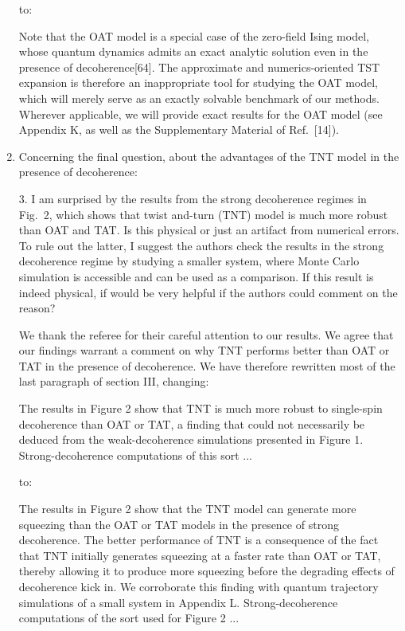 \documentclass[preprint,superscriptaddress]{revtex4-2}
\newcommand{\1}{\mathds{1}}
\newcommand{\blue}[1]{{\color{blue} #1}}
\newcommand{\red}[1]{{\color{red} #1}}
\newcommand{\green}[1]{{\color{ForestGreen} #1}}
\begin{document}
\begin{enumerate}
  to:

  \green{Note that the OAT model is a special case of the zero-field
    Ising model, whose quantum dynamics admits an exact analytic
    solution even in the presence of decoherence[64].  The approximate
    and numerics-oriented TST expansion is therefore an inappropriate
    tool for studying the OAT model, which will merely serve as an
    exactly solvable benchmark of our methods.  Wherever applicable,
    we will provide exact results for the OAT model (see Appendix K,
    as well as the Supplementary Material of Ref.~[14]).}


\item Concerning the final question, about the advantages of the TNT
  model in the presence of decoherence:

  \blue{3. I am surprised by the results from the strong decoherence
    regimes in Fig.~2, which shows that twist and-turn (TNT) model is
    much more robust than OAT and TAT. Is this physical or just an
    artifact from numerical errors. To rule out the latter, I suggest
    the authors check the results in the strong decoherence regime by
    studying a smaller system, where Monte Carlo simulation is
    accessible and can be used as a comparison. If this result is
    indeed physical, if would be very helpful if the authors could
    comment on the reason?}

  We thank the referee for their careful attention to our results.  We
  agree that our findings warrant a comment on why TNT performs better
  than OAT or TAT in the presence of decoherence.  We have therefore
  rewritten most of the last paragraph of section III, changing:

  \red{The results in Figure 2 show that TNT is much more robust to
    single-spin decoherence than OAT or TAT, a finding that could not
    necessarily be deduced from the weak-decoherence simulations
    presented in Figure 1.  Strong-decoherence computations of this
    sort ...}

  to:

  \green{The results in Figure 2 show that the TNT model can generate
    more squeezing than the OAT or TAT models in the presence of
    strong decoherence.  The better performance of TNT is a
    consequence of the fact that TNT initially generates squeezing at
    a faster rate than OAT or TAT, thereby allowing it to produce more
    squeezing before the degrading effects of decoherence kick in.  We
    corroborate this finding with quantum trajectory simulations of a
    small system in Appendix L.  Strong-decoherence computations of
    the sort used for Figure 2 ...}


\end{enumerate}
\end{document}
